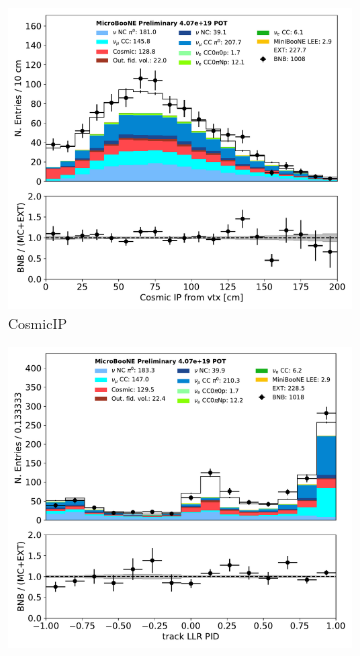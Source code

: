 \documentclass[a4paper]{article}
\begin{document}
\begin{figure}[H] 
\begin{center}
    \begin{subfigure}[b]{0.3\textwidth}
    \centering
    \includegraphics[width=1.00\textwidth]{1eNp/dataMCRun1/CosmicIP01152020.pdf}
    \caption{\label{fig:1eNp:dataMCRun1:CosmicIP} CosmicIP }
    \end{subfigure}
    \begin{subfigure}[b]{0.3\textwidth}
    \centering
    \includegraphics[width=1.00\textwidth]{1eNp/dataMCRun1/trkpid01152020.pdf}

\end{subfigure}
\end{center}
\end{figure}
\end{document}
